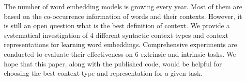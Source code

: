 The number of word embedding models is growing every year. Most of them are based on the co-occurrence information of words and their contexts. However, it is still an open question what is the best definition of context. We provide a systematical investigation of 4 different syntactic context types and context representations for learning word embeddings. Comprehensive experiments are conducted to evaluate their effectiveness on 6 extrinsic and intrinsic tasks. We hope that this paper, along with the published code, would be helpful for choosing the best context type and representation for a given task.
